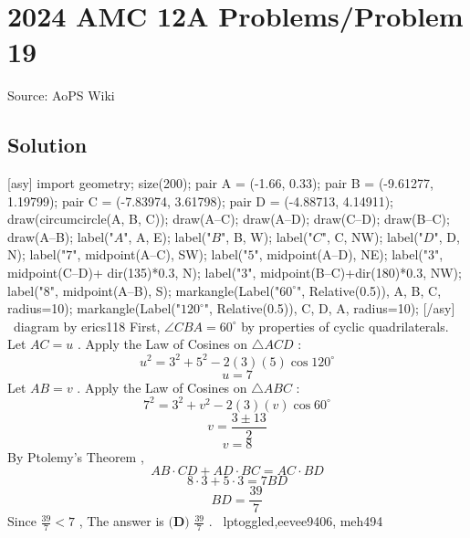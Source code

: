 \documentclass[12pt]{article}
\begin{document}
\section*{{2024 AMC 12A Problems/Problem 19}}
Source: AoPS Wiki

\subsection*{Solution}
[asy] import geometry; size(200); pair A = (-1.66, 0.33); pair B = (-9.61277, 1.19799); pair C = (-7.83974, 3.61798); pair D = (-4.88713, 4.14911); draw(circumcircle(A, B, C)); draw(A--C); draw(A--D); draw(C--D); draw(B--C); draw(A--B); label("$A$", A, E); label("$B$", B, W); label("$C$", C, NW); label("$D$", D, N); label("$7$", midpoint(A--C), SW); label("$5$", midpoint(A--D), NE); label("$3$", midpoint(C--D)+ dir(135)*0.3, N); label("$3$", midpoint(B--C)+dir(180)*0.3, NW); label("$8$", midpoint(A--B), S); markangle(Label("$60^\circ$", Relative(0.5)), A, B, C, radius=10); markangle(Label("$120^\circ$", Relative(0.5)), C, D, A, radius=10); [/asy] ~diagram by erics118 First, $\angle CBA=60 ^\circ$ by properties of cyclic quadrilaterals. Let $AC=u$ . Apply the Law of Cosines on $\triangle ACD$ : \[u^2=3^2+5^2-2(3)(5)\cos120^\circ\] \[u=7\] Let $AB=v$ . Apply the Law of Cosines on $\triangle ABC$ : \[7^2=3^2+v^2-2(3)(v)\cos60^\circ\] \[v=\frac{3\pm13}{2}\] \[v=8\] By Ptolemy’s Theorem , \[AB \cdot CD+AD \cdot BC=AC \cdot BD\] \[8 \cdot 3+5 \cdot 3=7BD\] \[BD=\frac{39}{7}\] Since $\frac{39}{7}<7$ ,
The answer is $\boxed{\textbf{(D) }\frac{39}{7}}$ . ~lptoggled,eevee9406, meh494
\end{document}
